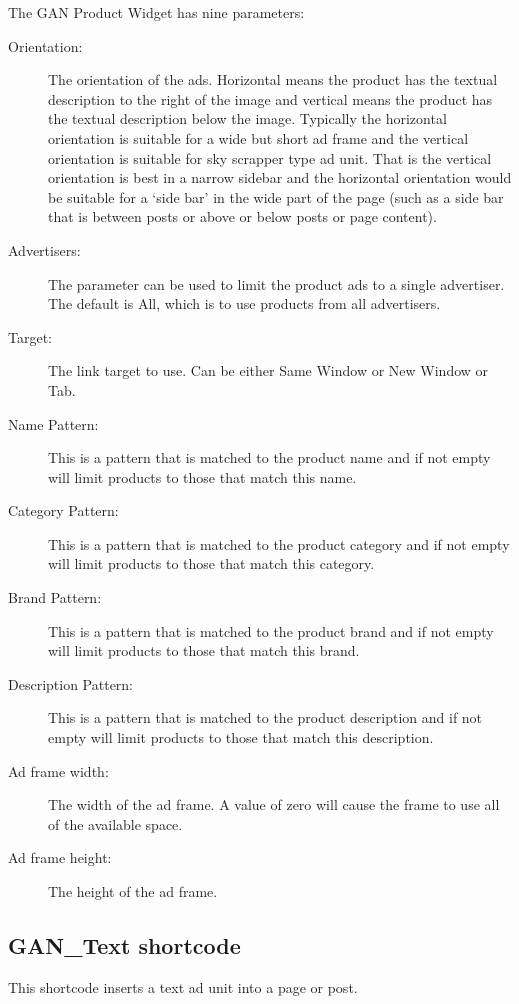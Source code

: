 \documentclass[letterpaper]{article}
\begin{document}
The GAN Product Widget has nine parameters:
\begin{description}
  \item[Orientation:] The orientation of the ads. Horizontal means the
product has the textual description to the right of the image and
vertical means the product has the textual description below the image.
Typically the horizontal orientation is suitable for a wide but short
ad frame and the vertical orientation is suitable for sky scrapper type
ad unit.  That is the vertical orientation is best in a narrow sidebar
and the horizontal orientation would be suitable for a `side bar' in the
wide part of the page (such as a side bar that is between posts or above
or below posts or page content).
  \item[Advertisers:] The parameter can be used to limit the product ads to
a single advertiser.  The default is All, which is to use products from all
advertisers.
  \item[Target:] The link target to use. Can be either Same 
Window or New Window or Tab.
  \item[Name Pattern:] This is a pattern that is matched to the product
name and if not empty will limit products to those that match this name.
  \item[Category Pattern:] This is a pattern that is matched to the
product category and if not empty will limit products to those that
match this category.
  \item[Brand Pattern:] This is a pattern that is matched to the product
brand and if not empty will limit products to those that match this brand.
  \item[Description Pattern:] This is a pattern that is matched to the
product description and if not empty will limit products to those that
match this description.
  \item[Ad frame width:] The width of the ad frame. A value
of zero will cause the frame to use all of the available space.
  \item[Ad frame height:] The height of the ad frame.
\end{description}


\subsection{GAN\_Text shortcode}

This shortcode inserts a text ad unit into a page or post.
\end{document}
